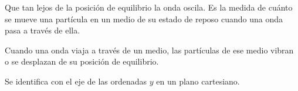 Que tan lejos de la posición de equilibrio la onda oscila. Es la medida de cuánto se mueve una partícula en un medio de su estado de reposo cuando una onda pasa a través de ella.

Cuando una onda viaja a través de un medio, las partículas de ese medio vibran o se desplazan de su posición de equilibrio.

Se identifica con el eje de las ordenadas $y$ en un plano cartesiano.

